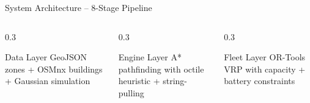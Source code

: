 \documentclass[aspectratio=169, 11pt]{beamer}
\begin{document}
\begin{frame}{System Architecture -- 8-Stage Pipeline}
\begin{center}
\end{center}

\vspace{0.2cm}
\begin{columns}[T]
\begin{column}{0.3\textwidth}
\begin{exampleblock}{\footnotesize Data Layer}
\footnotesize GeoJSON zones + OSMnx buildings + Gaussian simulation
\end{exampleblock}
\end{column}
\begin{column}{0.3\textwidth}
\begin{exampleblock}{\footnotesize Engine Layer}
\footnotesize A* pathfinding with octile heuristic + string-pulling
\end{exampleblock}
\end{column}
\begin{column}{0.3\textwidth}
\begin{exampleblock}{\footnotesize Fleet Layer}
\footnotesize OR-Tools VRP with capacity + battery constraints
\end{exampleblock}
\end{column}
\end{columns}
\end{frame}
\end{document}
